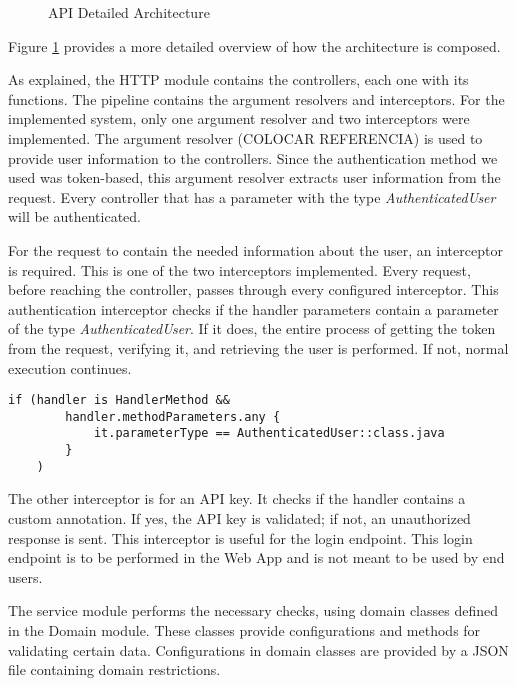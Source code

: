 \vspace{3mm}

\begin{figure}[H]
    \centering
    
    \caption{API Detailed Architecture}
    \label{fig:api_detailed_architecture}
\end{figure}

Figure \ref{fig:api_detailed_architecture} provides a more detailed overview of how the architecture is composed. 

As explained, the HTTP module contains the controllers, each one with its functions. The pipeline contains the argument resolvers and interceptors. For the implemented system, only one argument resolver and two interceptors were implemented. The argument resolver (COLOCAR REFERENCIA) is used to provide user information to the controllers. Since the authentication method we used was token-based, this argument resolver extracts user information from the request. Every controller that has a parameter with the type \textit{AuthenticatedUser} will be authenticated. 

For the request to contain the needed information about the user, an interceptor is required. This is one of the two interceptors implemented. Every request, before reaching the controller, passes through every configured interceptor. This authentication interceptor checks if the handler parameters contain a parameter of the type \textit{AuthenticatedUser}. If it does, the entire process of getting the token from the request, verifying it, and retrieving the user is performed. If not, normal execution continues.
\begin{center}
    \begin{lstlisting}[caption={Type AuthenticatedUser verification example}]
    if (handler is HandlerMethod &&
        handler.methodParameters.any {
            it.parameterType == AuthenticatedUser::class.java
        }
    )
    \end{lstlisting}
\end{center}

The other interceptor is for an API key. It checks if the handler contains a custom annotation. If yes, the API key is validated; if not, an unauthorized response is sent. This interceptor is useful for the login endpoint. This login endpoint is to be performed in the Web App and is not meant to be used by end users.

The service module performs the necessary checks, using domain classes defined in the Domain module. These classes provide configurations and methods for validating certain data. Configurations in domain classes are provided by a JSON file containing domain restrictions.

